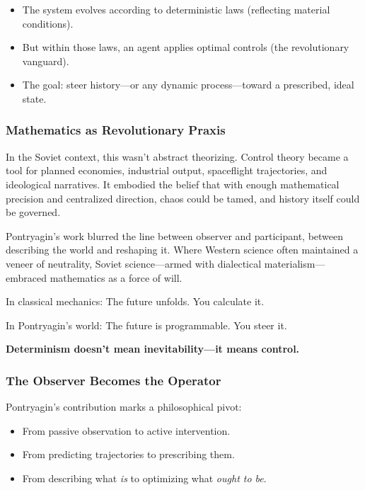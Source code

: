 \begin{itemize}
  \item The system evolves according to deterministic laws (reflecting material conditions).
  \item But within those laws, an agent applies optimal controls (the revolutionary vanguard).
  \item The goal: steer history—or any dynamic process—toward a prescribed, ideal state.
\end{itemize}

\subsubsection*{Mathematics as Revolutionary Praxis}

In the Soviet context, this wasn’t abstract theorizing. Control theory became a tool for planned economies, industrial output, spaceflight trajectories, and ideological narratives. It embodied the belief that with enough mathematical precision and centralized direction, chaos could be tamed, and history itself could be governed.

Pontryagin's work blurred the line between observer and participant, between describing the world and reshaping it. Where Western science often maintained a veneer of neutrality, Soviet science—armed with dialectical materialism—embraced mathematics as a force of will.

\begin{tcolorbox}[colback=blue!5!white, colframe=blue!50!black, title={Pontryagin’s Maximum Principle: Leninism in Mathematical Form}]
In classical mechanics:  
\quad The future unfolds. You calculate it.

In Pontryagin’s world:  
\quad The future is programmable. You steer it.

\textbf{Determinism doesn’t mean inevitability—it means control.}
\end{tcolorbox}

\subsubsection*{The Observer Becomes the Operator}

Pontryagin’s contribution marks a philosophical pivot:

\begin{itemize}
  \item From passive observation to active intervention.
  \item From predicting trajectories to prescribing them.
  \item From describing what \textit{is} to optimizing what \textit{ought to be}.
\end{itemize}


